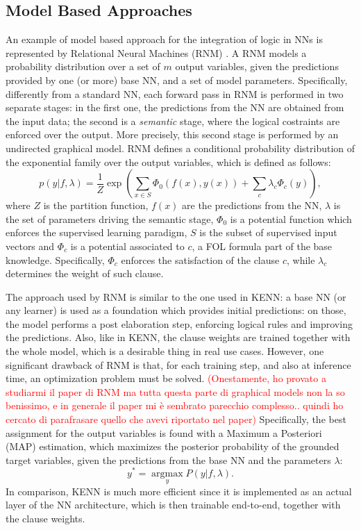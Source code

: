  \subsection{Model Based Approaches}
 An example of model based approach for the integration of logic in NNs is represented by Relational Neural Machines (RNM) \cite{marra2020relational}. A RNM models a probability distribution over a set of $m$ output variables, given the predictions provided by one (or more) base NN, and a set of model parameters. Specifically, differently from a standard NN, each forward pass in RNM is performed in two separate stages: in the first one, the predictions from the NN are obtained from the input data; the second is a \textit{semantic} stage, where the logical costraints are enforced over the output. More precisely, this second stage is performed by an undirected graphical model.
 RNM defines a conditional probability distribution of the exponential family over the output variables, which is defined as follows:
 \begin{equation*}
 p(y|f,\lambda) = \frac{1}{Z} \exp \left( \sum_{x \in S}\Phi_0(f(x),y(x))+\sum_c \lambda_c \Phi_c(y) \right), 
 \end{equation*}
 where $Z$ is the partition function, \textcolor{unipd}{$f(x)$ are the predictions from the NN}, $\lambda$ is the set of parameters driving the semantic stage, $\Phi_0$ is a potential function which enforces the supervised learning paradigm, $S$ is the subset of supervised input vectors and $\Phi_c$ is a potential associated to $c$, a FOL formula part of the base knowledge. Specifically, $\Phi_c$ enforces the satisfaction of the clause $c$, while $\lambda_c$ determines the weight of such clause. 
 
 The approach used by RNM is similar to the one used in KENN: a base NN (or any learner) is used as a foundation which provides initial predictions: on those, the model performs a post elaboration step, enforcing logical rules and improving the predictions. Also, like in KENN, the clause weights are trained together with the whole model, which is a desirable thing in real use cases. However, one significant drawback of RNM is that, for each training step, and also at inference time, an optimization problem must be solved. 
 \textcolor{red}{(Onestamente, ho provato a studiarmi il paper di RNM ma tutta questa parte di graphical models non la so benissimo, e in generale il paper mi è sembrato parecchio complesso.. quindi ho cercato di parafrasare quello che avevi riportato nel paper)}
 \textcolor{unipd}{Specifically, the best assignment for the output variables is found with a Maximum a Posteriori (MAP) estimation, which maximizes the posterior probability of the grounded target variables, given the predictions from the base NN and the parameters $\lambda$:
 \begin{equation*}
 y^* = \underset{y}{\operatorname{argmax}}P(y|f,\lambda).
 \end{equation*}}
 In comparison, KENN is much more efficient since it is implemented as an actual layer of the NN architecture, which is then trainable end-to-end, together with the clause weights.
 
